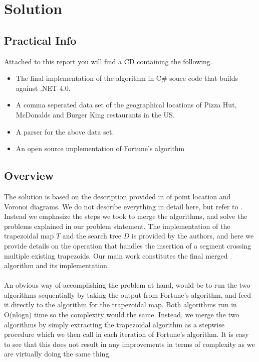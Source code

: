 \section{Solution}
\subsection{Practical Info}
Attached to this report you will find a CD containing the following.
\begin{itemize}
  \item The final implementation of the algorithm in C\# souce code that builds against .NET 4.0.
  \item A comma seperated data set of the geographical locations of Pizza Hut, McDonalds and Burger King restaurants in the US.
  \item A parser for the above data set.
  \item An open source implementation of Fortune's algorithm \cite{fortunes}
\end{itemize}

\subsection{Overview}
The solution is based on the description provided in \cite{computational_geometry} of point location and Voronoi diagrams. We do not describe everything in detail here, but refer to \cite{computational_geometry}. Instead we emphasize the steps we took to merge the algorithms, and solve the problems explained in our problem statement. The implementation of the trapezoidal map $T$ and the search tree $D$ is provided by the authors, and here we provide details on the operation that handles the insertion of a segment crossing multiple existing trapezoids. Our main work constitutes the final merged algorithm and its implementation.
\paragraph{}
An obvious way of accomplishing the problem at hand, would be to run the two algorithms sequentially by taking the output from Fortune's algorithm, and feed it directly to the algorithm for the trapezoidal map. Both algorithms run in O(nlogn)  time so the complexity would the same. Instead, we merge the two algorithms by simply extracting the trapezoidal algorithm as a stepwise procedure which we then call in each iteration of Fortune's algorithm. It is easy to see that this does not result in any improvements in terms of complexity as we are virtually doing the same thing.  

